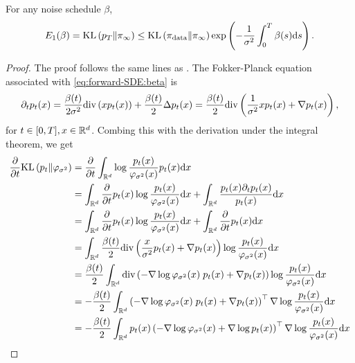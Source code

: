 \documentclass[english,graybox,envcountchap,envcountsame,sectrefs,shortlabels]{svmono}
\theoremstyle{style}
\newcommand{\eqsp}{}
\newcommand{\kl}{\mathrm{KL}}
\begin{document}
\begin{lemma} 
\label{lem:mix}For any noise schedule $\beta$,
    \begin{align*}
    E_1(\sched) = 
    \kl\left(p_T \| \pi_{\infty} \right) \leq  
    \kl\left(\pi_{\rm data} \|  \pi_{\infty} \right) 
    \exp\left(- \frac{1}{\sigma^2} \int_0^T \sched(s) \rmd s\right)  \eqsp.
    \end{align*}
\end{lemma}
\begin{proof}
The proof follows the same lines as \cite[Lemma 1]{franzese2023much}. The Fokker-Planck equation associated with \eqref{eq:forward-SDE:beta} is
\begin{align*}
    \partial_{t} p_{t}(x) = \frac{\sched(t)}{2\sigma^2} \text{div} \left( x p_{t} (x) \right) + \frac{\sched(t)}{2} \Delta p_{t} (x) =
    \frac{\sched(t)}{2}\text{div} \left(\frac{1}{\sigma^2}x p_{t} (x) + \nabla p_{t} (x)\right)
    \eqsp,
\end{align*}
for $t\in[0,T], x\in\mathbb{R}^d$. Combing this with the derivation under the integral theorem, we get
\begin{align*}
    \frac{\partial}{ \partial t} \kl \left( p_t \|\gausspdf_{\sigma^2}  \right) &= \frac{\partial}{\partial t} \int_{\mathbb{R}^d}  \log \frac{p_t(x)}{\gausspdf_{\sigma^2}(x)} p_t(x) \rmd x \\
    &= \int_{\mathbb{R}^d} \frac{\partial}{\partial t} p_t(x) \log \frac{p_t(x)}{\gausspdf_{\sigma^2}(x)}\rmd x + \int_{\mathbb{R}^d}\frac{p_t(x) \partial_t p_t(x)}{p_t(x)} \rmd x 
    \\
    &= \int_{\mathbb{R}^d} \frac{\partial}{\partial t} p_t(x) \log \frac{p_t(x)}{\gausspdf_{\sigma^2}(x)} \rmd x + \int_{\mathbb{R}^d} \frac{\partial}{\partial t} p_t(x) \rmd x
    \\
    &= \int_{\mathbb{R}^d} \frac{\sched(t)}{2} \text{div} \left( \frac{x}{\sigma^2} p_t(x) + \nabla p_t(x) \right) \log \frac{p_t(x)}{\gausspdf_{\sigma^2}(x)} \rmd x
    \\
    &= \frac{\sched(t)}{2} \int_{\mathbb{R}^d}  \text{div} \left(  - \nabla \log \gausspdf_{\sigma^2}(x) \; p_t(x)  +  \nabla p_t(x) \right) \log \frac{p_t(x)}{\gausspdf_{\sigma^2}(x)} \rmd x 
    \\
    &=  - \frac{\sched(t)}{2} \int_{\mathbb{R}^d} \left(- \nabla \log \gausspdf_{\sigma^2}(x) \; p_t(x)  +  \nabla p_t(x) \right)^\top \nabla \log \frac{p_t(x)}{\gausspdf_{\sigma^2}(x)} \rmd x 
    \\
    &= - \frac{\sched(t)}{2} \int_{\mathbb{R}^d} p_t(x) \left( - \nabla \log \gausspdf_{\sigma^2}(x)   +  \nabla \log p_t(x)\right)^\top \nabla \log \frac{p_t(x)}{\gausspdf_{\sigma^2}(x)} \rmd x\\

\end{align*}
\end{proof}
\end{document}
